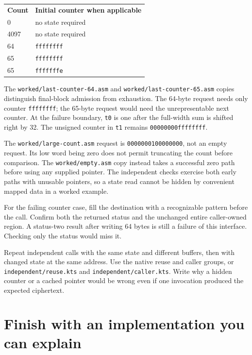 \begin{center}
  \begin{tabular}{ll}
    \textbf{Count} & \textbf{Initial counter when applicable} \\
    0              & no state required                        \\
    4097           & no state required                        \\
    64             & \texttt{ffffffff}                        \\
    65             & \texttt{ffffffff}                        \\
    65             & \texttt{fffffffe}
  \end{tabular}
\end{center}

The \texttt{worked/last-counter-64.asm} and
\texttt{worked/last-counter-65.asm} copies distinguish final-block admission
from exhaustion. The 64-byte request needs only counter \texttt{ffffffff}; the
65-byte request would need the unrepresentable next counter. At the failure
boundary, \texttt{t0} is one after the full-width sum is shifted right by 32.
The unsigned counter in \texttt{t1} remains \texttt{00000000ffffffff}.

The \texttt{worked/large-count.asm} request is
\texttt{0000000100000000}, not an empty request. Its low word being zero does
not permit truncating the count before comparison. The \texttt{worked/empty.asm}
copy instead takes a successful zero path before using any supplied pointer.
The independent checks exercise both early paths with unusable pointers, so a
state read cannot be hidden by convenient mapped data in a worked example.

For the failing counter case, fill the destination with a recognizable pattern
before the call. Confirm both the returned status and the unchanged entire
caller-owned region. A status-two result after writing 64 bytes is still a
failure of this interface. Checking only the status would miss it.



Repeat independent calls with the same state and different buffers, then with
changed state at the same address. Use the native reuse and caller groups, or
\texttt{independent/reuse.kts} and \texttt{independent/caller.kts}. Write why a hidden counter or a cached pointer would
be wrong even if one invocation produced the expected ciphertext.

\section{Finish with an implementation you can explain}

